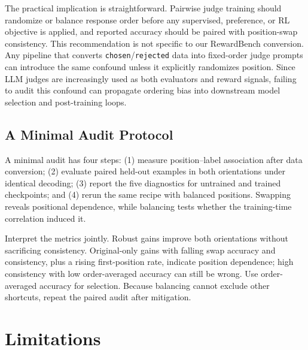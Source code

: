 \documentclass[letterpaper]{article}
\begin{document}
The practical implication is straightforward. Pairwise judge training should randomize or balance response order before any supervised, preference, or RL objective is applied, and reported accuracy should be paired with position-swap consistency. This recommendation is not specific to our RewardBench conversion. Any pipeline that converts \texttt{chosen}/\texttt{rejected} data into fixed-order judge prompts can introduce the same confound unless it explicitly randomizes position. Since LLM judges are increasingly used as both evaluators and reward signals, failing to audit this confound can propagate ordering bias into downstream model selection and post-training loops.

\subsection{A Minimal Audit Protocol}

A minimal audit has four steps: (1) measure position--label association after data conversion; (2) evaluate paired held-out examples in both orientations under identical decoding; (3) report the five diagnostics for untrained and trained checkpoints; and (4) rerun the same recipe with balanced positions. Swapping reveals positional dependence, while balancing tests whether the training-time correlation induced it.

Interpret the metrics jointly. Robust gains improve both orientations without sacrificing consistency. Original-only gains with falling swap accuracy and consistency, plus a rising first-position rate, indicate position dependence; high consistency with low order-averaged accuracy can still be wrong. Use order-averaged accuracy for selection. Because balancing cannot exclude other shortcuts, repeat the paired audit after mitigation.

\section*{Limitations}
\end{document}
